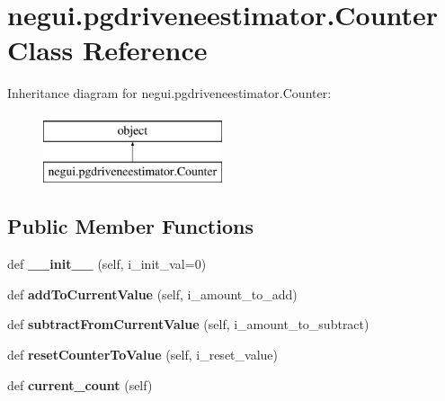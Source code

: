 \hypertarget{classnegui_1_1pgdriveneestimator_1_1Counter}{}\section{negui.\+pgdriveneestimator.\+Counter Class Reference}
\label{classnegui_1_1pgdriveneestimator_1_1Counter}
Inheritance diagram for negui.\+pgdriveneestimator.\+Counter\+:\begin{figure}[H]
\begin{center}
\leavevmode
\includegraphics[height=2.000000cm]{classnegui_1_1pgdriveneestimator_1_1Counter}
\end{center}
\end{figure}
\subsection*{Public Member Functions}
\begin{DoxyCompactItemize}
\item 
def {\bfseries \+\_\+\+\_\+init\+\_\+\+\_\+} (self, i\+\_\+init\+\_\+val=0)\hypertarget{classnegui_1_1pgdriveneestimator_1_1Counter_a43f73aa604351514f49c9739855c3be4}{}\label{classnegui_1_1pgdriveneestimator_1_1Counter_a43f73aa604351514f49c9739855c3be4}

\item 
def {\bfseries add\+To\+Current\+Value} (self, i\+\_\+amount\+\_\+to\+\_\+add)\hypertarget{classnegui_1_1pgdriveneestimator_1_1Counter_ac8089b4f487000821321e87144419dc2}{}\label{classnegui_1_1pgdriveneestimator_1_1Counter_ac8089b4f487000821321e87144419dc2}

\item 
def {\bfseries subtract\+From\+Current\+Value} (self, i\+\_\+amount\+\_\+to\+\_\+subtract)\hypertarget{classnegui_1_1pgdriveneestimator_1_1Counter_a448901fbdf9a96bd22c8fafe39d0f0c4}{}\label{classnegui_1_1pgdriveneestimator_1_1Counter_a448901fbdf9a96bd22c8fafe39d0f0c4}

\item 
def {\bfseries reset\+Counter\+To\+Value} (self, i\+\_\+reset\+\_\+value)\hypertarget{classnegui_1_1pgdriveneestimator_1_1Counter_aa52538cc4b8b1712c25f413200f194ea}{}\label{classnegui_1_1pgdriveneestimator_1_1Counter_aa52538cc4b8b1712c25f413200f194ea}

\item 
def {\bfseries current\+\_\+count} (self)\hypertarget{classnegui_1_1pgdriveneestimator_1_1Counter_ab388600a843053d09e0d4b526c6b4314}{}\label{classnegui_1_1pgdriveneestimator_1_1Counter_ab388600a843053d09e0d4b526c6b4314}

\end{DoxyCompactItemize}


